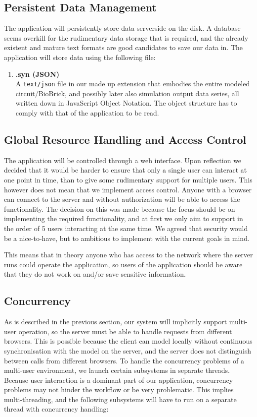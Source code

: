 \subsection{Persistent Data Management}
\label{ss-persitance}
The application will persistently store data serverside on the disk. A database seems overkill for the rudimentary data storage that is required, and the already existent and mature text formats are good candidates to save our data in. The application will store data using the following file:
\begin{enumerate}
\item \textbf{.syn (JSON)} \\
A \verb=text/json= file in our made up extension
that embodies the entire modeled circuit/BioBrick, and possibly later also simulation output data series, all written down in JavaScript Object Notation. The object structure has to comply with that of the application to be read.
\end{enumerate}

\subsection{Global Resource Handling and Access Control}
The application will be controlled through a web interface. Upon reflection we decided that it would be harder to ensure that only a single user can interact at one point in time, than to give some rudimentary support for multiple users. This however does not mean that we implement access control. Anyone with a browser can connect to the server and without authorization will be able to access the functionality. The decision on this was made because the focus should be on implementing the required functionality, and at first we only aim to support in the order of 5 users interacting at the same time. We agreed that security  would be a nice-to-have, but to ambitious to implement with the current goals in mind.

This means that in theory anyone who has access to the network where the server runs could operate the application, so users of the application should be aware that they do not work on and/or save sensitive information.

\subsection{Concurrency}
As is described in the previous section, our system will implicitly support multi-user operation, so the server must be able to handle requests from different browsers. This is possible because the client can model locally without continuous synchronisation with the model on the server, and the server does not distinguish between calls from different browsers. To handle the concurrency problems of a multi-user environment, we launch certain subsystems in separate threads. Because user interaction is a dominant part of our application, concurrency problems may not hinder the workflow or be very problematic. This implies multi-threading, and the following subsystems will have to run on a separate thread with concurrency handling:

